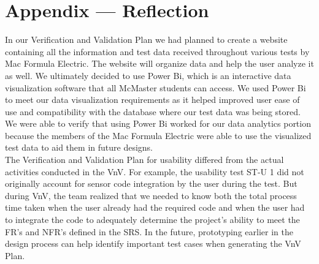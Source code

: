 \documentclass[12pt, titlepage]{article}
\begin{document}
\newpage{}
\section*{Appendix --- Reflection}


  In our Verification and Validation Plan we had planned to create a website containing all the information and test data received throughout various tests by Mac Formula Electric. The website will organize data and help the user analyze it as well. We ultimately decided to use Power Bi, which is an interactive data visualization software that all McMaster students can access. We used Power Bi to meet our data visualization requirements as it helped improved user ease of use and compatibility with the database where our test data was being stored. We were able to verify that using Power Bi worked for our data analytics portion because the members of the Mac Formula Electric were able to use the visualized test data to aid them in future designs.\\

 The Verification and Validation Plan for usability differed from the actual activities conducted in the VnV. For example, the usability test ST-U 1 did not originally account for sensor code integration by the user during the test. But during VnV, the team realized that we needed to know both the total process time taken when the user already had the required code and when the user had to integrate the code to adequately determine the project's ability to meet the FR's and NFR's defined in the SRS. In the future, prototyping earlier in the design process can help identify important test cases when generating the VnV Plan. \\  %
\end{document}
